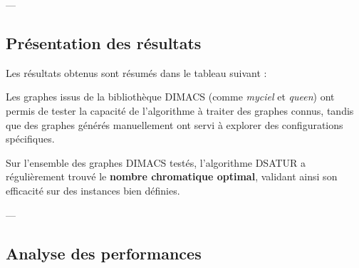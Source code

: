 \documentclass[11pt]{article}
\begin{document}
---

\subsection{Présentation des résultats}

Les résultats obtenus sont résumés dans le tableau suivant :

\begin{table}[h!]
    \centering
    \caption{Résultats des tests sur différents graphes}
    \label{tab:results}
\end{table}

Les graphes issus de la bibliothèque DIMACS (comme \textit{myciel} et \textit{queen}) ont permis de tester la capacité de l’algorithme à traiter des graphes connus, tandis que des graphes générés manuellement ont servi à explorer des configurations spécifiques.

Sur l’ensemble des graphes DIMACS testés, l’algorithme DSATUR a régulièrement trouvé le \textbf{nombre chromatique optimal}, validant ainsi son efficacité sur des instances bien définies.

---

\subsection{Analyse des performances}
\end{document}

